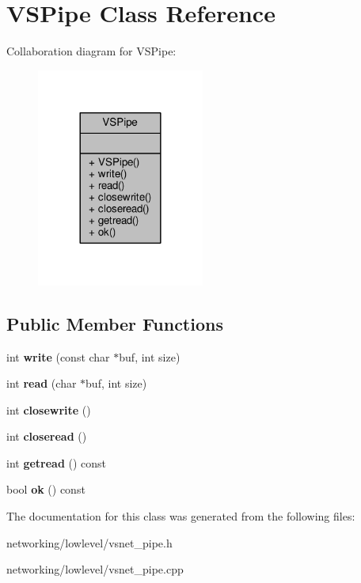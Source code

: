 \hypertarget{classVSPipe}{}\section{V\+S\+Pipe Class Reference}
\label{classVSPipe}


Collaboration diagram for V\+S\+Pipe\+:
\nopagebreak
\begin{figure}[H]
\begin{center}
\leavevmode
\includegraphics[width=156pt]{d5/dd3/classVSPipe__coll__graph}
\end{center}
\end{figure}
\subsection*{Public Member Functions}
\begin{DoxyCompactItemize}
\item 
int {\bfseries write} (const char $\ast$buf, int size)\hypertarget{classVSPipe_a7f33d87362a3817523c70531c8328319}{}\label{classVSPipe_a7f33d87362a3817523c70531c8328319}

\item 
int {\bfseries read} (char $\ast$buf, int size)\hypertarget{classVSPipe_a5eb9e5f73423595b2be1da3cf096429a}{}\label{classVSPipe_a5eb9e5f73423595b2be1da3cf096429a}

\item 
int {\bfseries closewrite} ()\hypertarget{classVSPipe_a22892523b22730ada4dbed1ced17a5ef}{}\label{classVSPipe_a22892523b22730ada4dbed1ced17a5ef}

\item 
int {\bfseries closeread} ()\hypertarget{classVSPipe_a3cb037d3593e4af0f2abb64dc46e9ff2}{}\label{classVSPipe_a3cb037d3593e4af0f2abb64dc46e9ff2}

\item 
int {\bfseries getread} () const \hypertarget{classVSPipe_a28fed5752e1cd06fd1a6e6090d77817e}{}\label{classVSPipe_a28fed5752e1cd06fd1a6e6090d77817e}

\item 
bool {\bfseries ok} () const \hypertarget{classVSPipe_a7831405320a56abc5372941c02240665}{}\label{classVSPipe_a7831405320a56abc5372941c02240665}

\end{DoxyCompactItemize}


The documentation for this class was generated from the following files\+:\begin{DoxyCompactItemize}
\item 
networking/lowlevel/vsnet\+\_\+pipe.\+h\item 
networking/lowlevel/vsnet\+\_\+pipe.\+cpp\end{DoxyCompactItemize}
